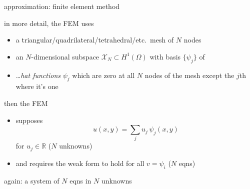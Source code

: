 \documentclass[hide notes,intlimits,usenames,dvipsnames]{beamer}
\newcommand{\RR}{\mathbb{R}}
\begin{document}
\begin{frame}{approximation: finite element method}

in more detail, the FEM uses
\begin{itemize}
\item a triangular/quadrilateral/tetrahedral/etc.~mesh of $N$ nodes
\item an $N$-dimensional subspace $\mathcal{X}_N \subset H^1(\Omega)$ with basis $\{\psi_j\}$ of
\item \begin{minipage}[t]{50mm}
\dots \emph{hat functions} $\psi_j$ which are zero at all $N$ nodes of the mesh except the $j$th where it's one
\end{minipage}
\qquad
\begin{minipage}[t]{40mm}
\vspace{-4mm}
\begin{tikzpicture}[scale=0.6, z={(.707,.3)}, baseline]

\end{tikzpicture}
\end{minipage}
\end{itemize}

then the FEM
\begin{itemize}
\item supposes
   $$u(x,y) = \sum_j u_{j}\, \psi_{j}(x,y)$$
for $u_j\in \RR$ ($N$ unknowns)
\item and requires the weak form to hold for all $v=\psi_i$ ($N$ eqns)
\end{itemize}

again: a system of $N$ eqns in $N$ unknowns
\end{frame}
\end{document}
